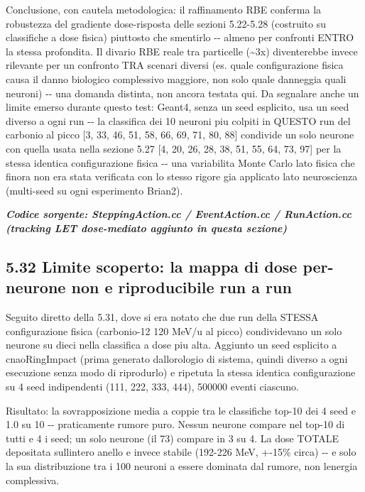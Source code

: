 \documentclass[
  italian,
]{article}
\begin{document}
Conclusione, con cautela metodologica: il raffinamento RBE conferma la robustezza del gradiente dose-risposta delle sezioni 5.22-5.28 (costruito su classifiche a dose fisica) piuttosto che smentirlo -\/- almeno per confronti ENTRO la stessa profondita\textquotesingle. Il divario RBE reale tra particelle (\textasciitilde3x) diventerebbe invece rilevante per un confronto TRA scenari diversi (es. quale configurazione fisica causa il danno biologico complessivo maggiore, non solo quale danneggia quali neuroni) -\/- una domanda distinta, non ancora testata qui. Da segnalare anche un limite emerso durante questo test: Geant4, senza un seed esplicito, usa un seed diverso a ogni run -\/- la classifica dei 10 neuroni piu\textquotesingle{} colpiti in QUESTO run del carbonio al picco {[}3, 33, 46, 51, 58, 66, 69, 71, 80, 88{]} condivide un solo neurone con quella usata nella sezione 5.27 {[}4, 20, 26, 28, 38, 51, 55, 64, 73, 97{]} per la stessa identica configurazione fisica -\/- una variabilita\textquotesingle{} Monte Carlo lato fisica che finora non era stata verificata con lo stesso rigore gia\textquotesingle{} applicato lato neuroscienza (multi-seed su ogni esperimento Brian2).

\textit{\textbf{Codice sorgente: SteppingAction.cc / EventAction.cc / RunAction.cc (tracking LET dose-mediato aggiunto in questa sezione)}}




\subsection{5.32 Limite scoperto: la mappa di dose per-neurone non e\textquotesingle{} riproducibile run a run}\label{limite-scoperto-la-mappa-di-dose-per-neurone-non-e-riproducibile-run-a-run}

Seguito diretto della 5.31, dove si era notato che due run della STESSA configurazione fisica (carbonio-12 120 MeV/u al picco) condividevano un solo neurone su dieci nella classifica a dose piu\textquotesingle{} alta. Aggiunto un seed esplicito a cnaoRingImpact (prima generato dall\textquotesingle orologio di sistema, quindi diverso a ogni esecuzione senza modo di riprodurlo) e ripetuta la stessa identica configurazione su 4 seed indipendenti (111, 222, 333, 444), 500000 eventi ciascuno.

Risultato: la sovrapposizione media a coppie tra le classifiche top-10 dei 4 seed e\textquotesingle{} 1.0 su 10 -\/- praticamente rumore puro. Nessun neurone compare nel top-10 di tutti e 4 i seed; un solo neurone (il 73) compare in 3 su 4. La dose TOTALE depositata sull\textquotesingle intero anello e\textquotesingle{} invece stabile (192-226 MeV, +-15\% circa) -\/- e\textquotesingle{} solo la sua distribuzione tra i 100 neuroni a essere dominata dal rumore, non l\textquotesingle energia complessiva.
\end{document}
